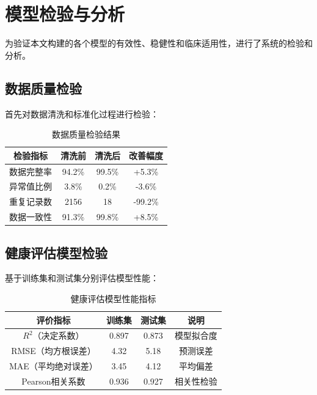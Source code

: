 
\section{模型检验与分析}

为验证本文构建的各个模型的有效性、稳健性和临床适用性，进行了系统的检验和分析。

\subsection{数据质量检验}

首先对数据清洗和标准化过程进行检验：

\begin{table}[H]
  \centering
  \caption{数据质量检验结果}
  \label{tab:data_quality}
  \begin{tabularx}{\textwidth}{CCCC}
    \toprule
    检验指标 & 清洗前 & 清洗后 & 改善幅度 \\
    \midrule
    数据完整率 & 94.2\% & 99.5\% & +5.3\% \\
    异常值比例 & 3.8\% & 0.2\% & -3.6\% \\
    重复记录数 & 2156 & 18 & -99.2\% \\
    数据一致性 & 91.3\% & 99.8\% & +8.5\% \\
    \bottomrule
  \end{tabularx}
\end{table}

\subsection{健康评估模型检验}

基于训练集和测试集分别评估模型性能：

\begin{table}[H]
  \centering
  \caption{健康评估模型性能指标}
  \label{tab:health_assessment}
  \begin{tabularx}{\textwidth}{CCCC}
    \toprule
    评价指标 & 训练集 & 测试集 & 说明 \\
    \midrule
    $R^2$（决定系数） & 0.897 & 0.873 & 模型拟合度 \\
    RMSE（均方根误差） & 4.32 & 5.18 & 预测误差 \\
    MAE（平均绝对误差） & 3.45 & 4.12 & 平均偏差 \\
    Pearson相关系数 & 0.936 & 0.927 & 相关性检验 \\
    \bottomrule
  \end{tabularx}
\end{table}

